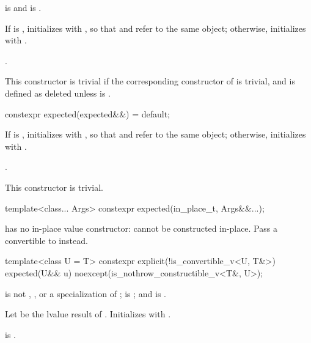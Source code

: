\begin{itemdescr}
\pnum
\constraints
{} is  and  is .

\pnum
\effects
If  is , initializes  with , so that  and  refer to the same object; otherwise, initializes  with .

\pnum
\ensures
{}.

\pnum
\remarks
This constructor is trivial if the corresponding constructor of  is trivial, and is defined as deleted unless  is .
\end{itemdescr}

%
\begin{itemdecl}
constexpr expected(expected&&) = default;
\end{itemdecl}

\begin{itemdescr}
\pnum
\effects
If  is , initializes  with , so that  and  refer to the same object; otherwise, initializes  with .

\pnum
\ensures
{}.

\pnum
\remarks
This constructor is trivial.
\end{itemdescr}

%
\begin{itemdecl}
template<class... Args> constexpr expected(in_place_t, Args&&...);
\end{itemdecl}

\begin{itemdescr}
\pnum
\remarks
{} has no in-place value constructor:  cannot be constructed in-place. Pass a  convertible to  instead.
\end{itemdescr}

%
\begin{itemdecl}
template<class U = T>
constexpr explicit(!is_convertible_v<U, T&>)
    expected(U&& u) noexcept(is_nothrow_constructible_v<T&, U>);
\end{itemdecl}

\begin{itemdescr}
\pnum
\constraints
{} is not , , or a specialization of ;  is ; and  is .

\pnum
\effects
Let  be the lvalue result of . Initializes  with .

\pnum
\ensures
{} is .
\end{itemdescr}

